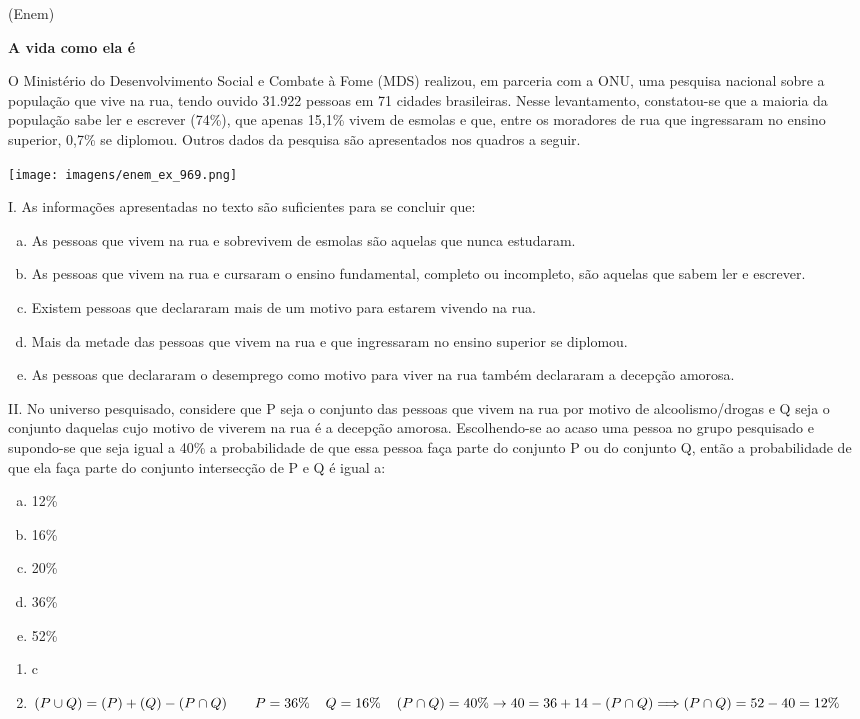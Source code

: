 \begin{ex}
(Enem) \begin{center}\textbf{A vida como ela é}
\end{center}		
O Ministério do Desenvolvimento Social e Combate à Fome (MDS) realizou, em parceria com a ONU, uma pesquisa nacional sobre a população que vive na rua, tendo ouvido 31.922 pessoas em 71 cidades brasileiras. Nesse levantamento, constatou-se que a maioria da população sabe ler e escrever (74\%), que apenas 15,1\% vivem de esmolas e que, entre os moradores de rua que ingressaram no ensino superior, 0,7\% se diplomou. Outros dados da pesquisa são apresentados nos quadros a seguir.
\begin{center}
\texttt{[image: imagens/enem\_ex\_969.png]}
\end{center}
I. As informações apresentadas no texto são suficientes para se concluir que:
   \begin{enumerate}[(a)]
   \item	As pessoas que vivem na rua e sobrevivem de esmolas são aquelas que nunca estudaram.
   \item 	As pessoas que vivem na rua e cursaram o ensino fundamental, completo ou incompleto, são aquelas que sabem ler e escrever.
   \item Existem pessoas que declararam mais de um motivo para estarem vivendo na rua.
   \item	Mais da metade das pessoas que vivem na rua e que ingressaram no ensino superior se diplomou.
   \item 	As pessoas que declararam o desemprego como motivo para viver na rua também declararam a decepção amorosa.
   \end{enumerate}
II.   	No universo pesquisado, considere que P seja o conjunto das pessoas que vivem na rua por motivo de alcoolismo/drogas e Q seja o conjunto daquelas cujo motivo de viverem na rua é a decepção amorosa.  Escolhendo-se ao acaso uma pessoa no grupo pesquisado e supondo-se que seja igual a 40\% a probabilidade de que essa pessoa faça parte do conjunto P ou do conjunto Q, então a probabilidade de que ela faça parte do conjunto intersecção de P e Q é igual a:
   \begin{enumerate}[(a)]
   \item 12\%
   \item 16\%
   \item 20\%
   \item 36\%
   \item 52\%
   \end{enumerate}
\begin{sol}
 \phantom{A} 
  \begin{enumerate}[I]  
 \item c 
 \item $(P\cup Q)= (P)+(Q)-( P\cap Q) \hspace{0,7cm} P=36\% \hspace{0,4cm}  Q=16\% \hspace{0,4cm} (P\cap Q) =40\% \\ \rightarrow 40=36+14-(P\cap Q)  \Longrightarrow (P\cap Q)=52-40=12\%$
  \end{enumerate}
\end{sol}
\end{ex}